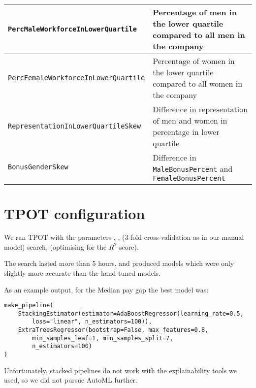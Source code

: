 \begin{centering}
{\begin{tabular}{|l|p{9cm}|}
        \texttt{PercMaleWorkforceInLowerQuartile} & Percentage of men in the lower quartile compared to all men in the company\\ \hline
        \texttt{PercFemaleWorkforceInLowerQuartile} & Percentage of women in the lower quartile compared to all women in the company\\ \hline
        \texttt{RepresentationInLowerQuartileSkew} & Difference in representation of men and women in percentage in lower quartile\\ \hline
        
        \texttt{BonusGenderSkew} & Difference in \texttt{MaleBonusPercent} and \texttt{FemaleBonusPercent} \\ \hline
        
    \end{tabular} 
    }

\end{centering}



\section{TPOT configuration}
\label{tpot-config}

We ran TPOT with the parameters 
,
, 
 (3-fold cross-validation as in our manual model)
search,
 (optimising for the $R^2$ score).

The search lasted more than 5 hours, and produced models which were only slightly more accurate than the hand-tuned models.

As an example output, for the Median pay gap the best model was:

\begin{scriptsize}
\begin{verbatim}
make_pipeline(
    StackingEstimator(estimator=AdaBoostRegressor(learning_rate=0.5,
        loss="linear", n_estimators=100)),
    ExtraTreesRegressor(bootstrap=False, max_features=0.8, 
        min_samples_leaf=1, min_samples_split=7, 
        n_estimators=100)
)
\end{verbatim}
\end{scriptsize}

Unfortunately, stacked pipelines do not work with the explainability tools we used, so we did not pursue AutoML further.


